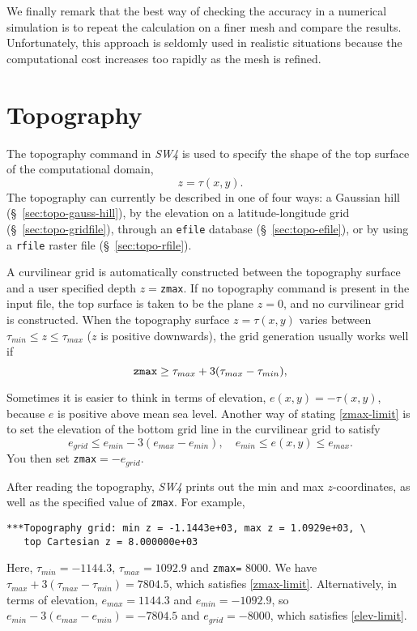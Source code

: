 \documentclass[11pt]{report}
\begin{document}
We finally remark that the best way of checking the accuracy in a numerical simulation is to repeat
the calculation on a finer mesh and compare the results. Unfortunately, this approach is seldomly
used in realistic situations because the computational cost increases too rapidly as the mesh is refined.

\chapter{Topography} \label{sec:topography}

The topography command in \emph{SW4} is used to specify the shape of the top surface of the
computational domain,
\[
z=\tau(x,y).
\]
The topography can currently be described in one of four ways: a Gaussian hill
(\S~\ref{sec:topo-gauss-hill}), by the elevation on a latitude-longitude grid
(\S~\ref{sec:topo-gridfile}), through an \verb+efile+ database (\S~\ref{sec:topo-efile}), or by
using a \verb+rfile+ raster file (\S~\ref{sec:topo-rfile}).

A curvilinear grid is automatically constructed between the topography surface and a user specified depth
$z=$\verb+zmax+. If no topography command is present in the input file, the top surface is taken to
be the plane $z=0$, and no curvilinear grid is constructed. When the topography surface $z=\tau(x,y)$ varies between
$\tau_{min}\leq z\leq \tau_{max}$ ($z$ is positive downwards), the grid generation usually works well if
\begin{equation}\label{zmax-limit}
\mbox{\tt zmax} \geq \tau_{max} + 3(\tau_{max}-\tau_{min}),
\end{equation}

Sometimes it is easier to think in terms of elevation, $e(x,y)=-\tau(x,y)$, because $e$ is positive
above mean sea level. Another way of stating \eqref{zmax-limit} is to set the elevation of the
bottom grid line in the curvilinear grid to satisfy
\begin{equation}
\label{elev-limit}
e_{grid} \leq e_{min} - 3(e_{max} - e_{min}),\quad e_{min}\leq e(x,y) \leq e_{max}.
\end{equation}
You then set \verb+zmax+$=-e_{grid}$.

After reading the topography, \emph{SW4} prints out the min and max $z$-coordinates, as well as the
specified value of \verb+zmax+. For example,
\begin{verbatim}
***Topography grid: min z = -1.1443e+03, max z = 1.0929e+03, \
   top Cartesian z = 8.000000e+03
\end{verbatim}
Here, $\tau_{min} = -1144.3$, $\tau_{max} = 1092.9$ and \verb+zmax=+ 8000.  We have $\tau_{max} +
3(\tau_{max}-\tau_{min})=7804.5$, which satisfies \eqref{zmax-limit}. Alternatively, in terms of
elevation, $e_{max}=1144.3$ and $e_{min}=-1092.9$, so $e_{min} - 3(e_{max}-e_{min}) = -7804.5$ and
$e_{grid}=-8000$, which satisfies \eqref{elev-limit}.
\end{document}
